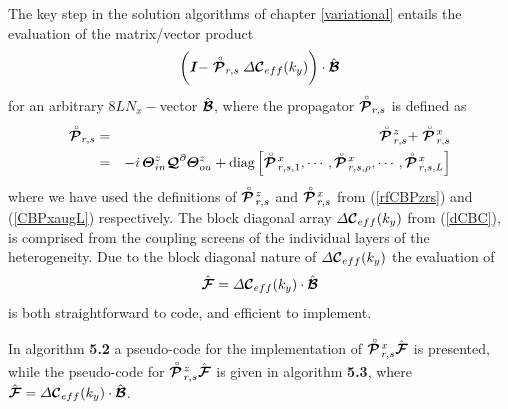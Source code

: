 The key step in the solution algorithms of chapter \ref{variational} 
entails the evaluation of the matrix/vector product
\[
\bigg({\bmi I} -  
\rf{\CB P}_{r,s}
{\mit \Delta}{\CB C}{}_{eff}(k_y)\bigg) \cdot \hat{\CB B}
\]
for an arbitrary $8 L N_x-$vector  $\hat{\CB B}$, where the propagator 
$\rf{\CB P}_{r,s}$ is defined as 
\begin{eqnarray} \label{CBPdef0}
\rf{\CB P}_{r,s}&=&\rf{\CB P}\!{}^{z}_{r,s}+\rf{\CB P}\!{}^{x}_{r,s}\nonumber\\
&=&-i\,{\bmi \Theta}^{z}_{in} {\CB Q}^{\partial} 
{\bmi \Theta}^{z}_{ou}
+\mbox{diag}\left[
\rf{\CB P}\!{}^{x}_{r,s, 1}, \cdots,
\rf{\CB P}\!{}^{x}_{r,s, \rho}, \cdots,
\rf{\CB P}\!{}^{x}_{r,s, L}
\right]
\end{eqnarray}
where we have used the definitions of $\rf{\CB P}\!{}^{z}_{r,s}$ and 
$\rf{\CB P}\!{}^{x}_{r,s}$ from (\ref{rfCBPzrs}) and (\ref{CBPxaugL}) 
respectively. 
The block diagonal array ${\mit \Delta}{\CB 
C}{}_{eff}(k_y)$ from (\ref{dCBC}),  is comprised from the coupling screens of the 
individual layers of the heterogeneity. Due to the block diagonal nature of
${\mit \Delta}{\CB C}{}_{eff}(k_y)$ the evaluation of 
\[
\hat{\CB F}={\mit \Delta}{\CB C}{}_{eff}(k_y)\cdot \hat{\CB B}
\]
is both straightforward to code, and efficient to implement.

In algorithm {\bf 5.2} a pseudo-code for the implementation of $\rf{\CB 
P}\!{}^{x}_{r,s} \hat{\CB F}$ is presented, while the pseudo-code for 
$\rf{\CB P}\!{}^{z}_{r,s} \hat{\CB F}$ is given in algorithm {\bf 5.3}, 
where $\hat{\CB F}={\mit \Delta}{\CB C}{}_{eff}(k_y)\cdot \hat{\CB B}$.


